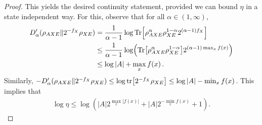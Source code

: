 \documentclass[11pt]{article}
\newcommand{\1}{\ensuremath{\mathbbm{1}}}
\theoremstyle{newdefinition}
\theoremstyle{newplain}
\newtheorem{lemma}[definition]{Lemma}
\theoremstyle{myplain}
\begin{document}
\begin{proof}
 This yields the desired continuity statement, provided we can bound $\eta$ in a state independent way. For this, observe that for all $\alpha \in (1,\infty)$, 
    \begin{align}
        D'_\alpha(\rho_{AXE}\| 2^{-f_{X}}\rho_{XE}) 
            &= \frac{1}{\alpha-1} \log \Tr[\rho_{AXE}^{\alpha} \rho_{XE}^{1-\alpha} 2^{(\alpha-1)f_{X}} ]\\
            &\leq \frac{1}{\alpha-1} \log( \Tr[\rho_{AXE}^{\alpha} \rho_{XE}^{1-\alpha} ] 2^{(\alpha - 1) \max_{x} f(x)}) \\
            &\leq \log |A| + \max_x f(x)\,.
    \end{align}
    Similarly, $-D'_\alpha(\rho_{AXE} \| 2^{-f_X}\rho_{XE}) \leq \log \tr[2^{-f_X} \rho_{XE}] \leq \log |A| - \min_x f(x)$. This implies that 
    \begin{align}
        \log \eta \leq \log (|A|2^{\max_x |f(x)|} + |A|2^{-\min_x f(x)}+1).
    \end{align}
\end{proof}

\end{document}
